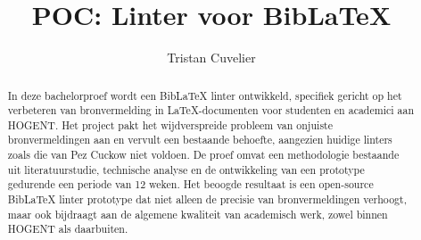 \documentclass{hogent-article}
\title{POC: Linter voor BibLaTeX}
\author{Tristan Cuvelier}
\begin{document}
\begin{abstract}
  

  In deze bachelorproef wordt een BibLaTeX linter ontwikkeld, specifiek gericht op het verbeteren van bronvermelding in LaTeX-documenten voor studenten en academici aan HOGENT. 
  Het project pakt het wijdverspreide probleem van onjuiste bronvermeldingen aan en vervult een bestaande behoefte, aangezien huidige linters zoals die van Pez Cuckow niet voldoen.
  De proef omvat een methodologie bestaande uit literatuurstudie, technische analyse en de ontwikkeling van een prototype gedurende een periode van 12 weken. Het beoogde resultaat 
  is een open-source BibLaTeX linter prototype dat niet alleen de precisie van bronvermeldingen verhoogt, maar ook bijdraagt aan de algemene kwaliteit van academisch werk, zowel binnen 
  HOGENT als daarbuiten.

\end{abstract}

\tableofcontents



\printbibliography[heading=bibintoc]
\end{document}
